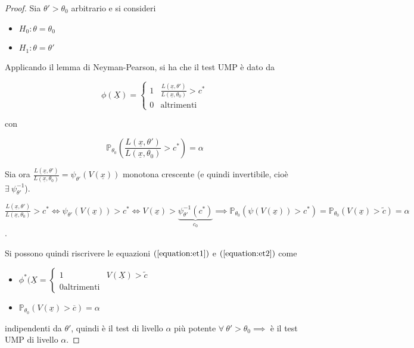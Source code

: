 \documentclass[hidelinks, 10pt]{report}
\begin{document}
\begin{proof}
Sia $ \theta' > \theta_{0} $ arbitrario e si consideri
\begin{itemize}
\item $ H_{0} : \theta = \theta_{0} $
\item $ H_{1} : \theta = \theta' $
\end{itemize}

Applicando il lemma di Neyman-Pearson, si ha che il test UMP \`e dato da

\begin{equation}	\label{equation:et1}
\phi(\underline{X}) = \begin{cases}
1 & \frac{L(\underline{x}, \theta')}{L(\underline{x}, \theta_{0})} > c^{\ast} \\
0 & \text{altrimenti}
\end{cases}
\end{equation}

con

\begin{equation}	\label{equation:et2}
\mathbb{P}_{\theta_{0}} \left( \frac{L(\underline{x}, \theta')}{L(\underline{x}, \theta_{0})} > c^{\ast} \right) = \alpha
\end{equation}

Sia ora $ \frac{L(\underline{x}, \theta')}{L(\underline{x}, \theta_{0})} = \psi_{\theta'} (V(\underline{x})) $ monotona crescente (e quindi invertibile, cio\`e $ \exists\ \psi_{\theta'}^{-1} $).

$ \frac{L(\underline{x}, \theta')}{L(\underline{x}, \theta_{0})} > c^{\ast} \iff \psi_{\theta'} (V(\underline{x})) > c^{\ast} \iff V(\underline{x}) > \underbrace{\psi_{\theta'}^{-1} (c^{\ast})}_{c_{0}} \implies \mathbb{P}_{\theta_{0}} (\psi(V(\underline{x})) > c^{\ast}) = \mathbb{P}_{\theta_{0}} (V(\underline{x}) > \tilde{c}) = \alpha $.

Si possono quindi riscrivere le equazioni $ (\ref{equation:et1}) $ e $ (\ref{equation:et2}) $ come
\begin{itemize}
\item $ \phi^{\ast} (\underline{X} = \begin{cases} 1 & V(\underline{X}) > \tilde{c} \\ 0 \text{altrimenti} \end{cases} $
\item $ \mathbb{P}_{\theta_{0}} (V(\underline{x}) > \overline{c}) = \alpha $
\end{itemize}

indipendenti da $ \theta' $, quindi \`e il test di livello $ \alpha $ pi\`u potente $ \forall\ \theta' > \theta_{0} \implies $ \`e il test UMP di livello $ \alpha $.
\end{proof}
\end{document}
